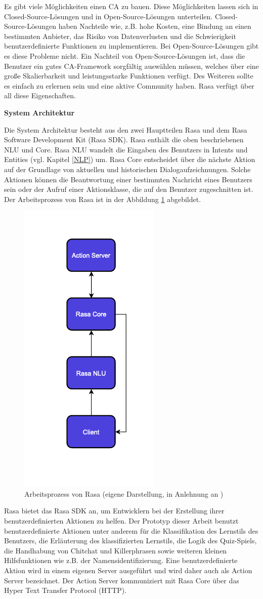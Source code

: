 Es gibt viele Möglichkeiten einen CA zu bauen. Diese Möglichkeiten lassen sich in Closed-Source-Lösungen und in Open-Source-Lösungen unterteilen.
Closed-Source-Lösungen haben Nachteile wie, z.B. hohe Kosten, eine Bindung an einen bestimmten Anbieter, das Risiko von Datenverlusten und die Schwierigkeit
benutzerdefinierte Funktionen zu implementieren. Bei Open-Source-Lösungen gibt es diese Probleme nicht. Ein Nachteil von Open-Source-Lösungen ist,
dass die Benutzer ein gutes CA-Framework sorgfältig auswählen müssen, welches über eine große Skalierbarkeit und leistungsstarke Funktionen verfügt. Des Weiteren sollte es
einfach zu erlernen sein und eine aktive Community haben. Rasa verfügt über all diese Eigenschaften. \parencite[25]{Kong.2021}

\textbf{System Architektur}

Die System Architektur besteht aus den zwei Hauptteilen Rasa und dem Rasa Software Development Kit (Rasa SDK).
Rasa enthält die oben beschriebenen NLU und Core. 
Rasa NLU wandelt die Eingaben des Benutzers in Intents und Entities (vgl. Kapitel \ref{NLP}) um. 
Rasa Core entscheidet über die nächste Aktion auf der Grundlage von aktuellen und historischen Dialogaufzeichnungen.
Solche Aktionen können die Beantwortung einer bestimmten Nachricht eines Benutzers sein oder der Aufruf einer Aktionsklasse,
die auf den Benutzer zugeschnitten ist. \parencite[26]{Kong.2021} Der Arbeitsprozess von Rasa ist in der Abbildung \ref{fig:Rasa} abgebildet.
\begin{figure}[H]
  \centering
  \includegraphics[width=0.25\linewidth]{images/rasa.png}
  \caption[Arbeitsprozess von Rasa]{Arbeitsprozess von Rasa (eigene Darstellung, in Anlehnung an \parencite[26]{Kong.2021})}
  \label{fig:Rasa}
\end{figure} 
Rasa bietet das Rasa SDK an, um Entwicklern bei der Erstellung ihrer benutzerdefinierten Aktionen zu helfen.
Der Prototyp dieser Arbeit benutzt benutzerdefinierte Aktionen unter anderem für die Klassifikation des Lernstils des Benutzers, 
die Erläuterung des klassifizierten Lernstils, die Logik des Quiz-Spiels, die Handhabung von Chitchat und Killerphrasen sowie weiteren kleinen Hilfsfunktionen wie 
z.B. der Namensidentifizierung.
Eine benutzerdefinierte Aktion wird in einem eigenen Server ausgeführt und wird daher auch als Action Server bezeichnet.
Der Action Server kommuniziert mit Rasa Core über das Hyper Text Transfer Protocol (HTTP). \parencite[26]{Kong.2021}

